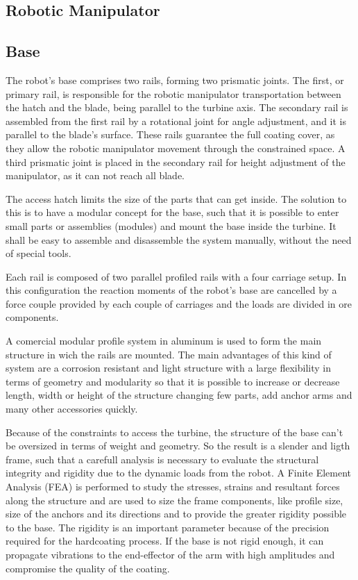 \subsection{Robotic Manipulator}

\subsection{Base}

The robot's base comprises two rails, forming two prismatic joints. The first,
or primary rail, is responsible for the robotic manipulator transportation
between the hatch and the blade, being parallel to the turbine axis. The
secondary rail is assembled from the first rail by a rotational joint for angle
adjustment, and it is parallel to the blade's surface. These rails guarantee the
full coating cover, as they allow the robotic manipulator movement through the
constrained space. A third prismatic joint is placed in the secondary rail for
height adjustment of the manipulator, as it can not reach all blade. 

The access hatch limits the size of the parts that can get
inside. The solution to this is to have a modular concept for the base, such
that it is possible to enter small parts or assemblies (modules) and mount
the base inside the turbine. It shall be easy to assemble and disassemble the
system manually, without the need of special tools. 

Each rail is composed of two parallel profiled rails with a four carriage setup.
In this configuration the reaction moments of the robot's base are cancelled by
a force couple provided by each couple of carriages and the loads are divided in
ore components.

A comercial modular profile system in aluminum is used to form the main
structure in wich the rails are mounted. 
The main advantages of this kind of system are a corrosion resistant and light
structure with a large flexibility in terms of geometry and modularity so that
it is possible to increase or decrease length, width or height of the structure
changing few parts, add anchor arms and many other accessories quickly.

Because of the constraints to access the turbine, the structure of the base
can't be oversized in terms of weight and geometry. So the result is a slender 
and ligth frame, such that a carefull analysis is necessary to evaluate the
structural integrity and rigidity due to the dynamic loads from the robot.
A Finite Element Analysis (FEA) is performed to study the stresses, strains and
resultant forces along the structure and are used to size the frame components,
like profile size, size of the anchors and its directions and to provide the
greater rigidity possible to the base. The rigidity is an important parameter
because of the precision required for the hardcoating process. If the base is
not rigid enough, it can propagate vibrations to the end-effector of the
arm with high amplitudes and compromise the quality of the coating.


